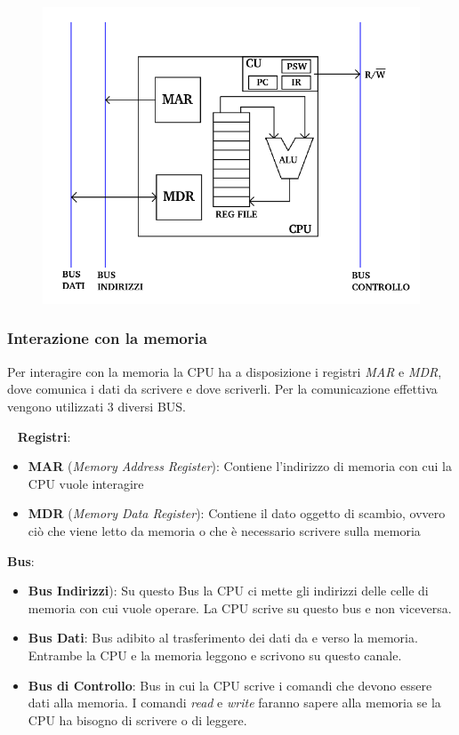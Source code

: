 \documentclass[a4paper,11pt,oneside]{book}
\begin{document}
\begin{figure}[h]
    \centering
    \includegraphics[scale=0.5]{cpu_didattica_schema}
\end{figure}
\newpage
\subsubsection{Interazione con la memoria}
Per interagire con la memoria la CPU ha a disposizione i registri \emph{MAR} e \emph{MDR}, dove comunica
i dati da scrivere e dove scriverli. Per la comunicazione effettiva vengono utilizzati 3 diversi BUS.

~\newline
\textbf{Registri}:
\begin{itemize}
    \item \textbf{MAR} (\emph{Memory Address Register}): Contiene l'indirizzo di memoria con cui la CPU vuole interagire
    \item \textbf{MDR} (\emph{Memory Data Register}): Contiene il dato oggetto di scambio, ovvero ciò che viene letto da memoria o che è necessario scrivere sulla memoria
\end{itemize}

\noindent \textbf{Bus}:
\begin{itemize}
    \item \textbf{Bus Indirizzi}): Su questo Bus la CPU ci mette gli indirizzi delle celle di memoria con cui vuole operare. La CPU scrive su questo bus e non viceversa.
    \item \textbf{Bus Dati}: Bus adibito al trasferimento dei dati da e verso la memoria. Entrambe la CPU e la memoria leggono e scrivono su questo canale.
    \item \textbf{Bus di Controllo}: Bus in cui la CPU scrive i comandi che devono essere dati alla memoria. I comandi \emph{read} e \emph{write} faranno sapere alla memoria
          se la CPU ha bisogno di scrivere o di leggere.
\end{itemize}
\end{document}
